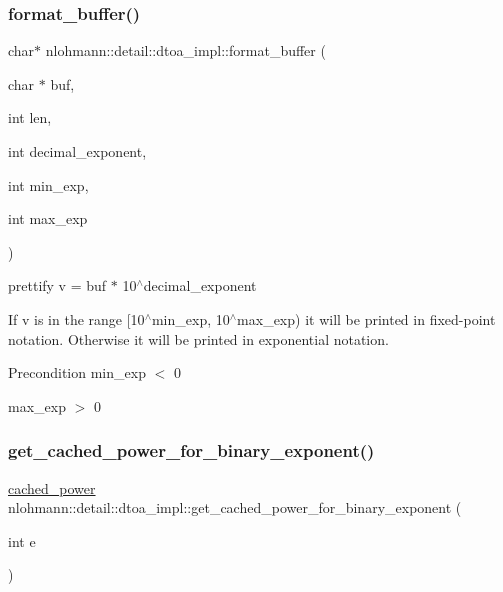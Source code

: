 \subsubsection{\texorpdfstring{format\+\_\+buffer()}{format\_buffer()}}
{\footnotesize\ttfamily char$\ast$ nlohmann\+::detail\+::dtoa\+\_\+impl\+::format\+\_\+buffer (\begin{DoxyParamCaption}\item[{char $\ast$}]{buf,  }\item[{int}]{len,  }\item[{int}]{decimal\+\_\+exponent,  }\item[{int}]{min\+\_\+exp,  }\item[{int}]{max\+\_\+exp }\end{DoxyParamCaption})\hspace{0.3cm}{\ttfamily [inline]}}



prettify v = buf $\ast$ 10$^\wedge$decimal\+\_\+exponent 

If v is in the range \mbox{[}10$^\wedge$min\+\_\+exp, 10$^\wedge$max\+\_\+exp) it will be printed in fixed-\/point notation. Otherwise it will be printed in exponential notation.

\begin{DoxyPrecond}{Precondition}
min\+\_\+exp $<$ 0 

max\+\_\+exp $>$ 0 
\end{DoxyPrecond}
\mbox{\label{namespacenlohmann_1_1detail_1_1dtoa__impl_adbf329a18c5cf854a3477327afd2200b}} 
\subsubsection{\texorpdfstring{get\+\_\+cached\+\_\+power\+\_\+for\+\_\+binary\+\_\+exponent()}{get\_cached\_power\_for\_binary\_exponent()}}
{\footnotesize\ttfamily \hyperlink{structnlohmann_1_1detail_1_1dtoa__impl_1_1cached__power}{cached\+\_\+power} nlohmann\+::detail\+::dtoa\+\_\+impl\+::get\+\_\+cached\+\_\+power\+\_\+for\+\_\+binary\+\_\+exponent (\begin{DoxyParamCaption}\item[{int}]{e }\end{DoxyParamCaption})\hspace{0.3cm}{\ttfamily [inline]}}

